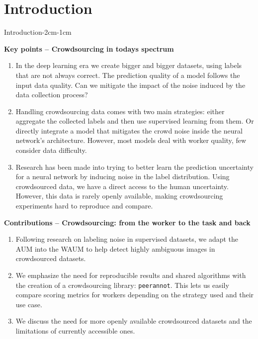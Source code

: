 \chapter{Introduction}
\enlargethispage{3\baselineskip}

\begin{keypointstwomargins}{Introduction}{-2cm}{-1cm}

        \textbf{Key points -- Crowdsourcing in todays spectrum}
        \begin{enumerate}[leftmargin=*]

        \item In the deep learning era we create bigger and bigger datasets, using labels that are not always correct. The prediction quality of a model follows the input data quality. Can we mitigate the impact of the noise induced by the data collection process?

        \item Handling crowdsourcing data comes with two main strategies: either aggregate the collected labels and then use supervised learning from them. Or directly integrate a model that mitigates the crowd noise inside the neural network's architecture. However, most models deal with worker quality, few consider data difficulty.

        \item Research has been made into trying to better learn the prediction uncertainty for a neural network by inducing noise in the label distribution. Using crowdsourced data, we have a direct access to the human uncertainty. However, this data is rarely openly available, making crowdsourcing experiments hard to reproduce and compare.

        \end{enumerate}

        \textbf{Contributions -- Crowdsourcing: from the worker to the task and back}
        \begin{enumerate}[leftmargin=*,start=4]
        \item Following research on labeling noise in supervised datasets, we adapt the AUM into the WAUM to help detect highly ambiguous images in crowdsourced datasets.

        \item We emphasize the need for reproducible results and shared algorithms with the creation of a crowdsourcing library: \texttt{peerannot}. This lets us easily compare scoring metrics for workers depending on the strategy used and their use case.

        \item We discuss the need for more openly available crowdsourced datasets and the limitations of currently accessible ones.
        \end{enumerate}

\end{keypointstwomargins}

